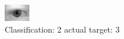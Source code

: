 \begin{figure}[h!]
\begin{center}
\includegraphics[width=0.60\columnwidth]{figures/ID629_class_2_target_3.png}
\end{center}
\caption{ Classification: 2 actual target: 3}
\label{fig:ID629_class_2_target_3}
\end{figure}
